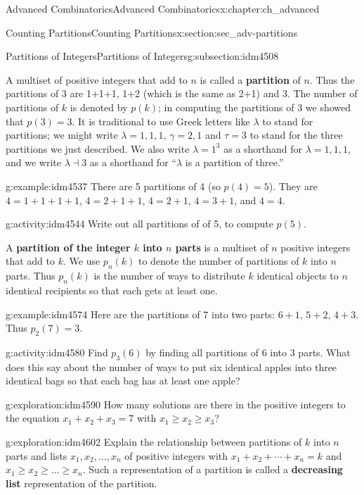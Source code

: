 \documentclass[oneside,10pt,]{book}
\newcommand{\terminology}[1]{\textbf{#1}}
\numberwithin{equation}{chapter}
\begin{document}
\begin{chapterptx}{Advanced Combinatorics}{}{Advanced Combinatorics}{}{}{x:chapter:ch_advanced}
\begin{sectionptx}{Counting Partitions}{}{Counting Partitions}{}{}{x:section:sec_adv-partitions}
\begin{subsectionptx}{Partitions of Integers}{}{Partitions of Integers}{}{}{g:subsection:idm4508}
\par
A multiset of positive integers that add to \(n\) is called a \terminology{partition} of \(n\). Thus the partitions of 3 are 1+1+1, 1+2 (which is the same as 2+1) and 3. The number of partitions of \(k\) is denoted by \(p(k)\); in computing the partitions of 3 we showed that \(p(3) = 3\). It is traditional to use Greek letters like \(\lambda\) to stand for partitions; we might write \(\lambda = 1,1,1\), \(\gamma= 2,1\) and \(\tau = 3\) to stand for the three partitions we just described. We also write \(\lambda = 1^3\) as a shorthand for \(\lambda = 1,1,1\), and we write \(\lambda \dashv 3\) as a shorthand for ``\(\lambda\) is a partition of three.''%
\begin{example}{}{g:example:idm4537}%
There are 5 partitions of 4 (so \(p(4) = 5\)).  They are \(4=1+1+1+1\), \(4=2+1+1\), \(4=2+1\), \(4=3+1\), and \(4=4\).\end{example}
\begin{activity}{}{g:activity:idm4544}%
Write out all partitions of of 5, to compute \(p(5)\).%
\end{activity}
A \terminology{partition of the integer \(k\) into \(n\) parts} is a multiset of \(n\) positive integers that add to \(k\). We use \(p_n(k)\) to denote the number of partitions of \(k\) into \(n\) parts. Thus \(p_n(k)\) is the number of ways to distribute \(k\) identical objects to \(n\) identical recipients so that each gets at least one.%
\begin{example}{}{g:example:idm4574}%
Here are the partitions of 7 into two parts: \(6+1\), \(5+2\), \(4+3\).  Thus \(p_2(7) = 3\).%
\end{example}
\begin{activity}{}{g:activity:idm4580}%
Find \(p_3(6)\) by finding all partitions of 6 into 3 parts. What does this say about the number of ways to put six identical apples into three identical bags so that each bag has at least one apple?%
\end{activity}
\begin{exploration}{}{g:exploration:idm4590}%
How many solutions are there in the positive integers to the equation \(x_1+x_2+x_3 =7\) with \(x_1\ge x_2\ge x_3\)?%
\end{exploration}
\begin{exploration}{}{g:exploration:idm4602}%
Explain the relationship between partitions of \(k\) into \(n\) parts and lists \(x_1,x_2,\ldots,x_n\) of positive integers with \(x_1 + x_2 + \cdots + x_n = k\) and \(x_1\ge x_2\ge\ldots \ge x_n\). Such a representation of a partition is called a \terminology{decreasing list} representation of the partition.%

\end{exploration}
\end{subsectionptx}
\end{sectionptx}
\end{chapterptx}
\end{document}
